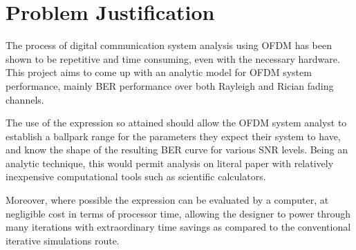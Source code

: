 
\section{Problem Justification}
The process of digital communication system analysis using \gls{OFDM} has been shown to be repetitive and time consuming, even with the necessary hardware. This project aims to come up with an analytic model for \gls{OFDM} system performance, mainly \gls{BER} performance over both Rayleigh and Rician fading channels.

The use of the expression so attained should allow the \gls{OFDM} system analyst to establish a ballpark range for the parameters they expect their system to have, and know the shape of the resulting \gls{BER} curve for various \gls{SNR} levels. Being an analytic technique, this would permit analysis on literal paper with relatively inexpensive computational tools such as scientific calculators.

Moreover, where possible the expression can be evaluated by a computer, at negligible cost in terms of processor time, allowing the designer to power through many iterations with extraordinary time savings as compared to the conventional iterative simulations route.